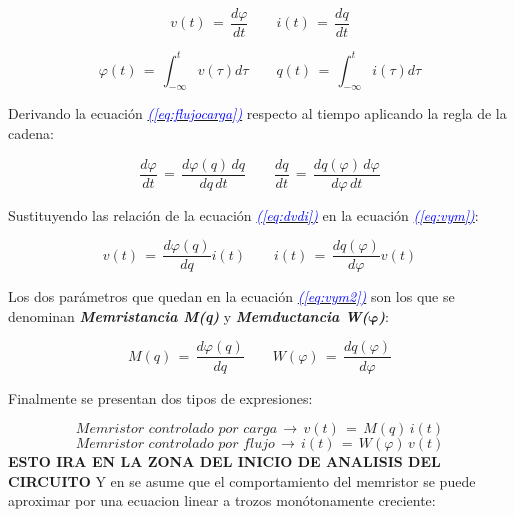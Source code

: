 \documentclass[12pt,a4paper]{report} %
\newcommand{\eref}[1]{\hyperref[#1]{\textcolor{blue}{\textit{(\ref*{#1})}}}}
\begin{document}
	\begin{equation}
		v(t)\,=\,\frac{d\varphi}{dt} \qquad i(t)\,=\,\frac{dq}{dt}
		\label{eq:dvdi}
	\end{equation}
			
	\begin{equation}
		\varphi(t)\,=\,\int_{-\infty}^{t}v(\tau)d\tau \qquad q(t)\,=\,\int_{-\infty}^{t}i(\tau)d\tau
		\label{eq:flujocargaintegral}
	\end{equation}\smallskip
	
	Derivando la ecuación \eref{eq:flujocarga} respecto al tiempo aplicando la regla de la cadena:
	
	\begin{equation}
		\frac{d\varphi}{dt}\,=\,\frac{d\varphi(q)\,dq}{dq\,dt} \qquad \frac{dq}{dt}\,=\,\frac{dq(\varphi)\,d\varphi}{d\varphi\,dt}
		\label{eq:vym}
	\end{equation}\smallskip
	
	Sustituyendo las relación de la ecuación \eref{eq:dvdi} en la ecuación \eref{eq:vym}:
	
	\begin{equation}
		v(t)\,=\,\frac{d\varphi(q)}{dq}i(t) \qquad i(t)\,=\,\frac{dq(\varphi)}{d\varphi}v(t)
		\label{eq:vym2}
	\end{equation}\smallskip
	
	Los dos parámetros que quedan en la ecuación \eref{eq:vym2} son los que se denominan \textbf{\textit{Memristancia M(q)}} y \textbf{\textit{Memductancia W($\bm{\varphi}$)}}: 
	
	\begin{equation}
		M(q)\,=\,\frac{d\varphi(q)}{dq} \qquad W(\varphi)\,=\,\frac{dq(\varphi)}{d\varphi}
		\label{eq:myw}
	\end{equation}\smallskip
	
	Finalmente se presentan dos tipos de expresiones:
	
	\begin{equation}
		\textit{Memristor controlado por carga} \, \rightarrow \, v(t)\,=\,M(q)\,i(t)
		\label{eq:cc}
	\end{equation}\smallskip
	\begin{equation}
		\textit{Memristor controlado por flujo} \, \rightarrow \, i(t)\,=\,W(\varphi)\,v(t)
		\label{eq:fc}
	\end{equation}\smallskip
	\textbf{{\color{red}ESTO IRA EN LA ZONA DEL INICIO DE ANALISIS DEL CIRCUITO}}
	Y en \cite{chuaoscillator2008} se asume que el comportamiento del memristor se puede aproximar por una ecuacion linear a trozos monótonamente creciente:
	
\end{document}
